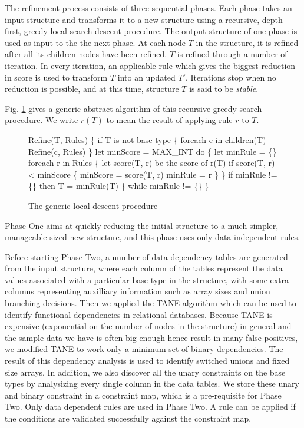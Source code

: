 The refinement process consists of three sequential phases. Each phase takes
an input structure and transforms it to a new structure using 
a recursive, depth-first, greedy local search descent procedure. The output 
structure of one phase is used as input to the the next phase. 
At each node $T$ in the structure, it is refined after all its
children nodes have been refined. $T$ is refined through a number of
iteration. In every iteration, an applicable rule which
gives the biggest reduction in score is used to transform $T$ into
an updated $T'$.  Iterations stop when no reduction is possible, and at
this time, structure $T$ is said to be {\em stable}.

Fig. \ref{fig:refinement} gives 
a generic abstract algorithm of this recursive greedy search procedure. 
We write $r(T)$ to mean the result of applying
rule $r$ to $T$.

\begin{figure}
\begin{code}
Refine(T, Rules)
\{
  if T is not base type 
  \{
    foreach c in children(T)
      Refine(c, Rules)
  \}
  let minScore = MAX_INT
  do \{
    let minRule = \{\}
    foreach r in Rules 
    \{
      let score(T, r) be the score of r(T) 
      if score(T, r) < minScore
      \{
        minScore = score(T, r)
        minRule = r
      \}
    \}
    if minRule != \{\} then T = minRule(T)
  \} while minRule != \{\}
\}
\end{code}
\caption{The generic local descent procedure}
\label{fig:refinement}
\end{figure}

Phase One aims at quickly reducing the initial structure to 
a much simpler, manageable sized new structure, and this phase uses only
data independent rules. 

Before starting Phase Two, 
a number of data dependency tables are generated from the input structure, where each
column of the tables represent the data values associated with a particular base type 
in the structure, with some extra columns representing auxilliary information such as
array sizes and union branching decisions. Then we applied the TANE algorithm \cite{TANE-HKPT99}
which can be used to identify functional dependencies in relational databases.
Because TANE is expensive (exponential on the number of nodes in the structure) in general
and the sample data we have is often big enough hence result in many false positives,
we modified TANE to work only a minimum set of binary dependencies. The result of
this dependency analysis is used to identify switched unions and fixed size arrays.
In addition, we also discover all the unary constraints on the base types by
analysizing every single column in the data tables. We store these unary and
binary constraint in a constraint map, which is a pre-requisite for Phase Two.
Only data dependent rules are used in Phase Two. 
A rule can be applied if the conditions are validated successfully
against the constraint map. 

